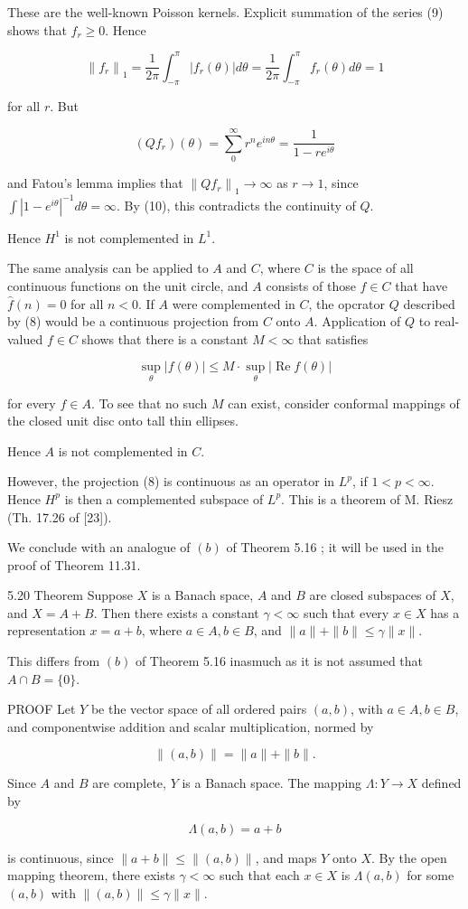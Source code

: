 \documentclass[10pt]{article}
\begin{document}
These are the well-known Poisson kernels. Explicit summation of the series (9) shows that $f_{r} \geq 0$. Hence

$$
\left\|f_{r}\right\|_{1}=\frac{1}{2 \pi} \int_{-\pi}^{\pi}\left|f_{r}(\theta)\right| d \theta=\frac{1}{2 \pi} \int_{-\pi}^{\pi} f_{r}(\theta) d \theta=1
$$

for all $r$. But

$$
\left(Q f_{r}\right)(\theta)=\sum_{0}^{\infty} r^{n} e^{i n \theta}=\frac{1}{1-r e^{i \theta}}
$$

and Fatou's lemma implies that $\left\|Q f_{r}\right\|_{1} \rightarrow \infty$ as $r \rightarrow 1$, since $\int\left|1-e^{i \theta}\right|^{-1} d \theta=\infty$. By (10), this contradicts the continuity of $Q$.

Hence $H^{1}$ is not complemented in $L^{1}$.

The same analysis can be applied to $A$ and $C$, where $C$ is the space of all continuous functions on the unit circle, and $A$ consists of those $f \in C$ that have $\hat{f}(n)=0$ for all $n<0$. If $A$ were complemented in $C$, the opcrator $Q$ described by (8) would be a continuous projection from $C$ onto $A$. Application of $Q$ to real-valued $f \in C$ shows that there is a constant $M<\infty$ that satisfies

$$
\sup _{\theta}|f(\theta)| \leq M \cdot \sup _{\theta}|\operatorname{Re} f(\theta)|
$$

for every $f \in A$. To see that no such $M$ can exist, consider conformal mappings of the closed unit disc onto tall thin ellipses.

Hence $A$ is not complemented in $C$.

However, the projection (8) is continuous as an operator in $L^{p}$, if $1<p<\infty$. Hence $H^{p}$ is then a complemented subspace of $L^{p}$. This is a theorem of M. Riesz (Th. 17.26 of [23]).

We conclude with an analogue of $(b)$ of Theorem 5.16 ; it will be used in the proof of Theorem 11.31.

5.20 Theorem Suppose $X$ is a Banach space, $A$ and $B$ are closed subspaces of $X$, and $X=A+B$. Then there exists a constant $\gamma<\infty$ such that every $x \in X$ has a representation $x=a+b$, where $a \in A, b \in B$, and $\|a\|+\|b\| \leq \gamma\|x\|$.

This differs from $(b)$ of Theorem 5.16 inasmuch as it is not assumed that $A \cap B=\{0\}$.

PROOF Let $Y$ be the vector space of all ordered pairs $(a, b)$, with $a \in A, b \in B$, and componentwise addition and scalar multiplication, normed by

$$
\|(a, b)\|=\|a\|+\|b\| .
$$

Since $A$ and $B$ are complete, $Y$ is a Banach space. The mapping $\Lambda: Y \rightarrow X$ defined by

$$
\Lambda(a, b)=a+b
$$

is continuous, since $\|a+b\| \leq\|(a, b)\|$, and maps $Y$ onto $X$. By the open mapping theorem, there exists $\gamma<\infty$ such that each $x \in X$ is $\Lambda(a, b)$ for some $(a, b)$ with $\|(a, b)\| \leq \gamma\|x\|$.
\end{document}
